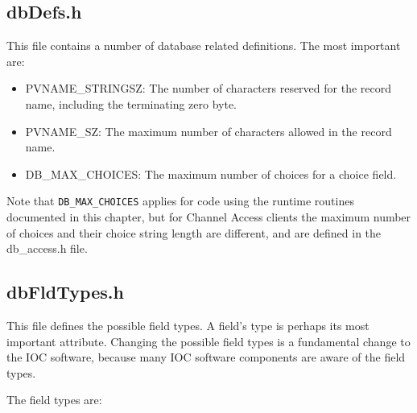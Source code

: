 \subsection{dbDefs.h}

This file contains a number of database related definitions.
The most important are:

\begin{itemize}
\item {}PVNAME\_STRINGSZ: The number of characters reserved for the record name, including the terminating zero byte.

\item {}PVNAME\_SZ: The maximum number of characters allowed in the record name.

\item {}DB\_MAX\_CHOICES: The maximum number of choices for a choice field.

\end{itemize}

Note that \verb|DB_MAX_CHOICES| applies for code using the runtime routines documented in this chapter, but for Channel Access clients the maximum number of choices and their choice string length are different, and are defined in the db_access.h file.

\subsection{dbFldTypes.h}

This file defines the possible field types.
A field's type is perhaps its most important attribute.
Changing the possible field types is a fundamental change to the IOC software, because many IOC software components are aware of the field types.

The field types are:

